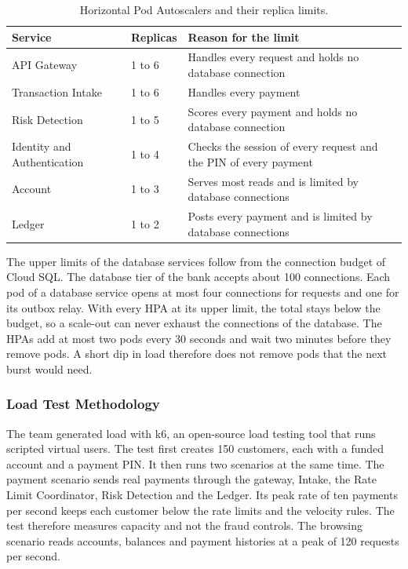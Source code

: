 \documentclass[11pt,a4paper]{article}
\begin{document}
\begin{table}[H]\centering\small
\caption{Horizontal Pod Autoscalers and their replica limits.}\label{tab:hpa}
\begin{tabularx}{\linewidth}{@{}L{3.6cm}L{1.6cm}Y@{}}
\toprule
Service & Replicas & Reason for the limit \\
\midrule
API Gateway & 1 to 6 & Handles every request and holds no database connection \\
Transaction Intake & 1 to 6 & Handles every payment \\
Risk Detection & 1 to 5 & Scores every payment and holds no database connection \\
Identity and Authentication & 1 to 4 & Checks the session of every request and the PIN of every payment \\
Account & 1 to 3 & Serves most reads and is limited by database connections \\
Ledger & 1 to 2 & Posts every payment and is limited by database connections \\
\bottomrule
\end{tabularx}
\end{table}

The upper limits of the database services follow from the connection budget of Cloud SQL. The database tier of the bank accepts about 100 connections. Each pod of a database service opens at most four connections for requests and one for its outbox relay. With every HPA at its upper limit, the total stays below the budget, so a scale-out can never exhaust the connections of the database. The HPAs add at most two pods every 30 seconds and wait two minutes before they remove pods. A short dip in load therefore does not remove pods that the next burst would need.

\subsubsection{Load Test Methodology}

The team generated load with k6, an open-source load testing tool that runs scripted virtual users. The test first creates 150 customers, each with a funded account and a payment PIN. It then runs two scenarios at the same time. The payment scenario sends real payments through the gateway, Intake, the Rate Limit Coordinator, Risk Detection and the Ledger. Its peak rate of ten payments per second keeps each customer below the rate limits and the velocity rules. The test therefore measures capacity and not the fraud controls. The browsing scenario reads accounts, balances and payment histories at a peak of 120 requests per second.
\end{document}
